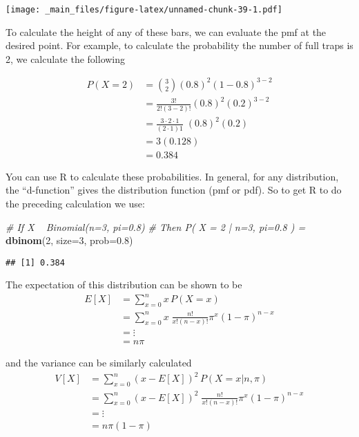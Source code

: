 \documentclass[]{book}
\newenvironment{Shaded}{\begin{snugshade}}{\end{snugshade}}
\newcommand{\KeywordTok}[1]{\textcolor[rgb]{0.13,0.29,0.53}{\textbf{{#1}}}}
\newcommand{\DataTypeTok}[1]{\textcolor[rgb]{0.13,0.29,0.53}{{#1}}}
\newcommand{\DecValTok}[1]{\textcolor[rgb]{0.00,0.00,0.81}{{#1}}}
\newcommand{\FloatTok}[1]{\textcolor[rgb]{0.00,0.00,0.81}{{#1}}}
\newcommand{\CommentTok}[1]{\textcolor[rgb]{0.56,0.35,0.01}{\textit{{#1}}}}
\newcommand{\NormalTok}[1]{{#1}}
\begin{document}
\texttt{[image: \_main\_files/figure-latex/unnamed-chunk-39-1.pdf]}

To calculate the height of any of these bars, we can evaluate the pmf at
the desired point. For example, to calculate the probability the number
of full traps is 2, we calculate the following

\[\begin{aligned} P(X=2)    
  &=    {3 \choose 2}\left(0.8\right)^{2}\left(1-0.8\right)^{3-2} \\
    &=  \frac{3!}{2!(3-2)!}(0.8)^{2}(0.2)^{3-2} \\
    &=  \frac{3\cdot2\cdot1}{(2\cdot1)1}\;(0.8)^{2}(0.2) \\
    &=  3(0.128) \\
    &=  0.384 \end{aligned}\]

You can use R to calculate these probabilities. In general, for any
distribution, the ``d-function'' gives the distribution function (pmf or
pdf). So to get R to do the preceding calculation we use:

\begin{Shaded}
\begin{Highlighting}[]
\CommentTok{# If    X ~ Binomial(n=3, pi=0.8)}
\CommentTok{# Then  P( X = 2 | n=3, pi=0.8 ) =}
\KeywordTok{dbinom}\NormalTok{(}\DecValTok{2}\NormalTok{, }\DataTypeTok{size=}\DecValTok{3}\NormalTok{, }\DataTypeTok{prob=}\FloatTok{0.8}\NormalTok{)}
\end{Highlighting}
\end{Shaded}

\begin{verbatim}
## [1] 0.384
\end{verbatim}

The expectation of this distribution can be shown to be
\[\begin{aligned}E[X]   
  &=    \sum_{x=0}^{n}x\,P(X=x) \\
    &=  \sum_{x=0}^{n}x\;\frac{n!}{x!\left(n-x\right)!}\pi^{x}\left(1-\pi\right)^{n-x}\\
    &=  \vdots \\
    &=  n\pi \end{aligned}\]

and the variance can be similarly calculated \[\begin{aligned} V[X]  
  &=    \sum_{x=0}^{n}\left(x-E\left[X\right]\right)^{2}\,P\left(X=x|n,\pi\right) \\
    &=  \sum_{x=0}^{n}\left(x-E\left[X\right]\right)^{2}\;\frac{n!}{x!\left(n-x\right)!}\pi^{x}\left(1-\pi\right)^{n-x} \\
    &=  \vdots \\
    &=  n\pi(1-\pi) \end{aligned}\]
\end{document}
